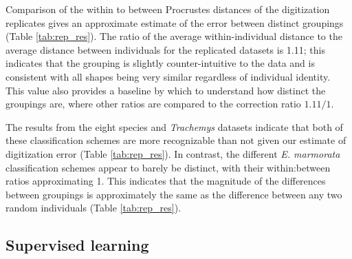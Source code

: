 \documentclass[fleqn,10pt,lineno]{wlpeerj} %
\begin{document}
Comparison of the within to between Procrustes distances of the digitization replicates gives an approximate estimate of the error between distinct groupings (Table \ref{tab:rep_res}). The ratio of the average within-individual distance to the average distance between individuals for the replicated datasets is 1.11; this indicates that the grouping is slightly counter-intuitive to the data and is consistent with all shapes being very similar regardless of individual identity. This value also provides a baseline by which to understand how distinct the groupings are, where other ratios are compared to the correction ratio \(1.11/1\). 

The results from the eight species and \textit{Trachemys} datasets indicate that both of these classification schemes are more recognizable than not given our estimate of digitization error (Table \ref{tab:rep_res}). In contrast, the different \textit{E. marmorata} classification schemes appear to barely be distinct, with their within:between ratios approximating 1. This indicates that the magnitude of the differences between groupings is approximately the same as the difference between any two random individuals (Table \ref{tab:rep_res}).

\subsection*{Supervised learning}
\end{document}

